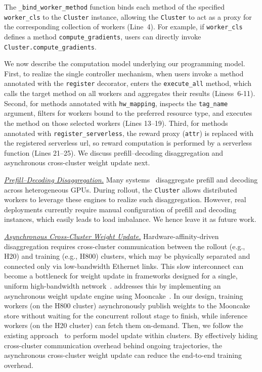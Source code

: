  The \texttt{\_bind\_worker\_method} function binds each method of the specified \texttt{worker\_cls} to the \texttt{Cluster} instance, allowing the \texttt{Cluster} to act as a proxy for the corresponding collection of workers (Line~4). For example, if \texttt{worker\_cls} defines a method \texttt{compute\_gradients}, users can directly invoke \texttt{Cluster.compute\_gradients}.

We now describe the computation model underlying our programming model. First, to realize the single controller mechanism, when users invoke a method annotated with the \texttt{register} decorator, \SystemName{} enters the \texttt{execute\_all} method, which calls the target method on all workers and aggregates their results (Liness~6-11). Second, for methods annotated with \texttt{hw\_mapping}, \SystemName{} inspects the \texttt{tag\_name} argument, filters for workers bound to the preferred resource type, and executes the method on those selected workers (Lines 13–19). Third, for methods annotated with \texttt{register\_serverless}, the reward proxy (\texttt{attr}) is replaced with the registered serverless url, so reward computation is performed by a serverless function (Lines 21–25). We discuss prefill–decoding disaggregation and asynchronous cross-cluster weight update next. 



\noindent\textit{\underline{Prefill–Decoding Disaggregation.}} Many systems~\cite{distserve, patel2023splitwise} disaggregate prefill and decoding across heterogeneous GPUs. During rollout, the \texttt{Cluster} allows distributed workers to leverage these engines to realize such disaggregation. However, real deployments currently require manual configuration of prefill and decoding instances, which easily leads to load imbalance. We hence leave it as future work. 



\noindent\textit{\underline{Asynchronous Cross-Cluster Weight Update.}} Hardware-affinity-driven disaggregation requires cross-cluster communication between the rollout (e.g., H20) and training (e.g., H800) clusters, which may be physically separated and connected only via low-bandwidth Ethernet links. This slow interconnect can become a bottleneck for weight update in frameworks designed for a single, uniform high-bandwidth network~\cite{verl}. \SystemName{} addresses this by implementing an asynchronous weight update engine using Mooncake~\cite{qin2024mooncake}. In our design, training workers (on the H800 cluster) asynchronously publish weights to the Mooncake store without waiting for the concurrent rollout stage to finish, while inference workers (on the H20 cluster) can fetch them on-demand. Then, we follow the existing approach~\cite{verl} to perform model update within clusters. By effectively hiding cross-cluster communication overhead behind ongoing trajectories, the asynchronous cross-cluster weight update can reduce the end-to-end training overhead. 

